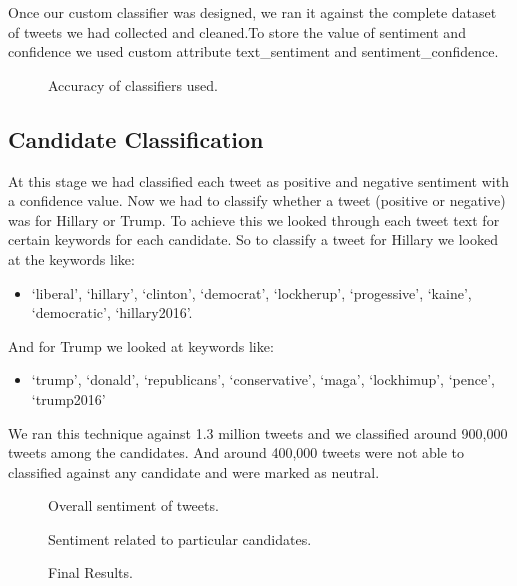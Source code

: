 \documentclass{acm_proc_article-sp}
\begin{document}
Once our custom classifier was designed, we ran it against the complete dataset of tweets we had collected and cleaned.To store the value of sentiment and confidence we used custom attribute text\_sentiment and sentiment\_confidence.

\begin{figure}
\centering
{}
\caption{Accuracy of classifiers used.}
\end{figure}

\subsection{Candidate Classification}
At this stage we had classified each tweet as positive and negative sentiment with a confidence value. Now we had to classify whether a tweet (positive or negative) was for Hillary or Trump.
To achieve this we looked through each tweet text for certain keywords for each candidate. So to classify a tweet for Hillary we looked at the keywords like: 
\begin{itemize}
\item `liberal', `hillary', `clinton', `democrat', `lockherup', `progessive', `kaine', `democratic', `hillary2016'.
\end{itemize}
And for Trump we looked at keywords like:
\begin{itemize}
\item `trump', `donald', `republicans', `conservative', `maga', `lockhimup', `pence', `trump2016'
\end{itemize}
We ran this technique against 1.3 million tweets and we classified around 900,000 tweets among the 
candidates. And around 400,000 tweets were not able to classified against any candidate and were marked as neutral.

\begin{figure}
\centering
{}
\caption{Overall sentiment of tweets.}
\end{figure}

\begin{figure}
\centering
{}
\caption{Sentiment related to particular candidates.}
\end{figure}

\begin{figure}
\centering
{}
\caption{Final Results.}
\end{figure}
\end{document}

